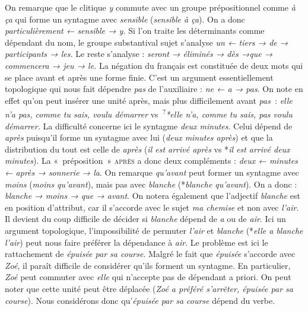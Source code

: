 {    
    \begin{exe}
     On remarque que le clitique \textit{y} commute avec un groupe prépositionnel comme \textit{à ça} qui forme un syntagme avec \textit{sensible} (\textit{sensible à ça}). On a donc \textit{particulièrement ← sensible → y.}
     Si l’on traite les déterminants comme dépendant du nom, le groupe substantival sujet s’analyse \textit{un ← tiers → de → participants → les.} Le reste s’analyse : \textit{seront → éliminés → dès →que → commencera → jeu → le.}
     La négation du français est constituée de deux mots qui se place avant et après une forme finie. C’est un argument essentiellement topologique qui nous fait dépendre \textit{pas} de l’auxiliaire : \textit{ne ← a → pas}. On note en effet qu’on peut insérer une unité après, mais plus difficilement avant \textit{pas~}: \textit{elle n’a pas, comme tu sais, voulu démarrer} vs~\textsuperscript{?}\textit{*elle n’a, comme tu sais, pas voulu démarrer.}
     La difficulté concerne ici le syntagme \textit{deux minutes}. Celui dépend de \textit{après} puisqu’il forme un syntagme avec lui (\textit{deux minutes après}) et que la distribution du tout est celle de \textit{après} (\textit{il est arrivé après} vs *\textit{il est arrivé deux minutes}). La «~préposition~» \textsc{après} a donc deux compléments : \textit{deux ← minutes ← après → sonnerie → la}.
     On remarque \textit{qu’avant} peut former un syntagme avec \textit{moins} (\textit{moins qu’avant}), mais pas avec \textit{blanche} (*\textit{blanche qu’avant}). On a donc : \textit{blanche → moins → que → avant}. On notera également que l’adjectif \textit{blanche} est en position d’attribut, car il s’accorde avec le sujet \textit{ma chemise} et non avec \textit{l’air}. Il devient du coup difficile de décider si \textit{blanche} dépend de \textit{a} ou de \textit{air}. Ici un argument topologique, l’impossibilité de permuter \textit{l’air} et \textit{blanche} (*\textit{elle a blanche l’air}) peut nous faire préférer la dépendance à \textit{air}.
     Le problème est ici le rattachement de \textit{épuisée par sa course}. Malgré le fait que \textit{épuisée} s’accorde avec \textit{Zoé}, il paraît difficile de considérer qu’ils forment un syntagme. En particulier, \textit{Zoé} peut commuter avec \textit{elle} qui n’accepte pas de dépendant a priori. On peut noter que cette unité peut être déplacée (\textit{Zoé a préféré s’arrêter, épuisée par sa course}). Nous considérons donc qu’\textit{épuisée par sa course} dépend du verbe.

\end{exe}}
